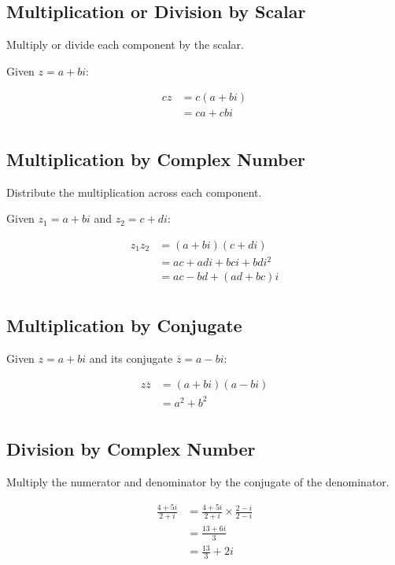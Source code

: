 \documentclass[a4paper,11pt]{report}
\begin{document}
\subsection{Multiplication or Division by Scalar}

Multiply or divide each component by the scalar.

Given $z = a + bi$:

$$
\begin{aligned}
cz & = c(a + bi) \\
& = ca + cbi \\
\end{aligned}
$$

\subsection{Multiplication by Complex Number}

Distribute the multiplication across each component.

Given $z_1 = a + bi$ and $z_2 = c + di$:

$$
\begin{aligned}
z_1 z_2 & = (a + bi)(c + di) \\
& = ac + adi + bci + bdi^2 \\
& = ac - bd + (ad + bc)i \\
\end{aligned}
$$

\subsection{Multiplication by Conjugate}

Given $z = a + bi$ and its conjugate $\overline{z} = a - bi$:

$$
\begin{aligned}
z \overline{z} & = (a + bi)(a - bi) \\
& = a^2 + b^2 \\
\end{aligned}
$$

\subsection{Division by Complex Number}

Multiply the numerator and denominator by the conjugate of the denominator.

$$
\begin{aligned}
\frac{4 + 5i}{2 + i} & = \frac{4 + 5i}{2 + i} \times \frac{2 - i}{2 - i} \\
& = \frac{13 + 6i}{3} \\
& = \frac{13}{3} + 2i \\
\end{aligned}
$$
\end{document}
